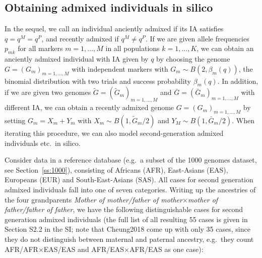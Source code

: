 \documentclass[12pt]{article}
\theoremstyle{definition}
\begin{document}
 
\subsection{Obtaining admixed individuals in silico}
\label{S:insilico}
{\color{blue}In the sequel, we call an individual anciently admixed if its IA satisfies $q = q^M = q^P$, and recently admixed if $q^M\neq q^P$. If we are given allele frequencies $p_{mk}$ for all markers $m=1,...,M$ in all populations $k=1,...,K$, we can obtain an anciently admixed individual with IA given by $q$ by choosing the genome $G=(G_m)_{m=1,...,M}$ with independent markers with $G_m \sim B(2, \beta_m(q))$, the binomial distribution with two trials and success probability $\beta_m(q)$. In addition, if we are given two genomes $\tilde G = (\tilde G_m)_{m=1,...,M}$ and $\bar G = (\bar G_m)_{m=1,...,M}$ with different IA, we can obtain a recently admixed genome $G=(G_m)_{m=1,...,M}$ by setting $G_m = X_m + Y_m$ with $X_m \sim B(1, \tilde G_m/2)$ and $Y_M \sim B(1, \bar G_m/2)$. }%
When iterating this procedure, we can also model second-generation admixed individuals etc.\ in silico.

{\color{blue} Consider data in a reference database (e.g.\ a subset of the 1000 genomes dataset, see Section~\ref{ss:1000}),}  consisting of Africans (AFR), East-Asians (EAS), Europeans (EUR) and South-East-Asians (SAS). All cases for second generation admixed individuals fall into one of seven categories. Writing up the ancestries of the four grandparents {\it Mother of mother/father of mother$\times$mother of father/father of father}, we have the following distinguishable cases for second generation admixed individuals (the full list of all resulting 55 cases is given in {\color{blue} Section S2.2 in} the SI; note that \cite{article}{Cheung2018} come up with only 35 cases, since they do not distinguish between maternal and paternal ancestry, e.g.\ they count AFR/AFR$\times$EAS/EAS and AFR/EAS$\times$AFR/EAS as one case):
\end{document}
